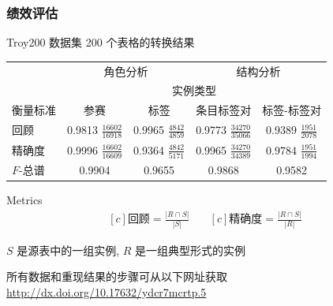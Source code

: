 \documentclass[10pt]{beamer}
\begin{document}
\begin{frame}
\frametitle{绩效评估}
\small{Troy200 数据集 200 个表格的转换结果}
\footnotesize{
\begin{table}
		\centering
		    \bgroup
        \def\arraystretch{1.5}
				\begin{tabular}{|l|c|c|c|c|}
						\hline
														& \multicolumn{2}{|c|}{角色分析} & \multicolumn{2}{|c|}{结构分析} \\
														\cline{2-5}
														& \multicolumn{4}{|c|}{实例类型} \\
														\cline{2-5}
			            衡量标准   & 参赛                      & 标签                     & 条目标签对            & 标签-标签对  \\
			      \hline
			            回顾    & 0.9813 $\frac{16602}{16918}$ & 0.9965 $\frac{4842}{4859}$ & 0.9773 $\frac{34270}{35066}$ & 0.9389 $\frac{1951}{2078}$ \\
			            精确度 & 0.9996 $\frac{16602}{16609}$ & 0.9364 $\frac{4842}{5171}$ & 0.9965 $\frac{34270}{34389}$ & 0.9784 $\frac{1951}{1994}$ \\
									$F$-总谱 & 0.9904                       & 0.9655                     & 0.9868                       & 0.9582                     \\
			      \hline
		    \end{tabular}
				\egroup
\end{table}
}
\begin{block}{\small Metrics}
\footnotesize{
\begin{equation*}
\begin{aligned}[c]
\text{回顾} = \frac{\left|R \cap S\right|}{\left|S\right|}
\end{aligned}
\quad
\begin{aligned}[c]
\text{精确度} = \frac{\left|R \cap S\right|}{\left|R\right|}
\end{aligned}
\end{equation*}
}
\scriptsize{\centerline{$S$ 是源表中的一组实例, $R$ 是一组典型形式的实例}}
\end{block}
\tiny 所有数据和重现结果的步骤可从以下网址获取 \url{http://dx.doi.org/10.17632/ydcr7mcrtp.5}
\end{frame}
\end{document}
